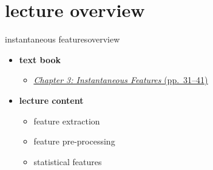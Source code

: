 

\subtitle{Part 4.1: Instantaneous Features~---~Introduction}


	

    \section[overview]{lecture overview}
        \begin{frame}{instantaneous features}{overview}
            \begin{itemize}
                \item   \textbf{text book}  
                    \begin{itemize}
                        \item   \href{http://ieeexplore.ieee.org/xpl/ebooks/bookPdfWithBanner.jsp?fileName=6331120.pdf&bkn=6266785&pdfType=chapter}{\underline{\textit{Chapter 3: Instantaneous Features} (pp.~31--41)}}
                    \end{itemize}
                \bigskip
                \item<2->   \textbf{lecture content}
                    \begin{itemize}
                        \item<2->   feature extraction 
                        \item<3->   feature pre-processing
                        \item<4->   statistical features
                    \end{itemize}
            \end{itemize}
        \end{frame}

